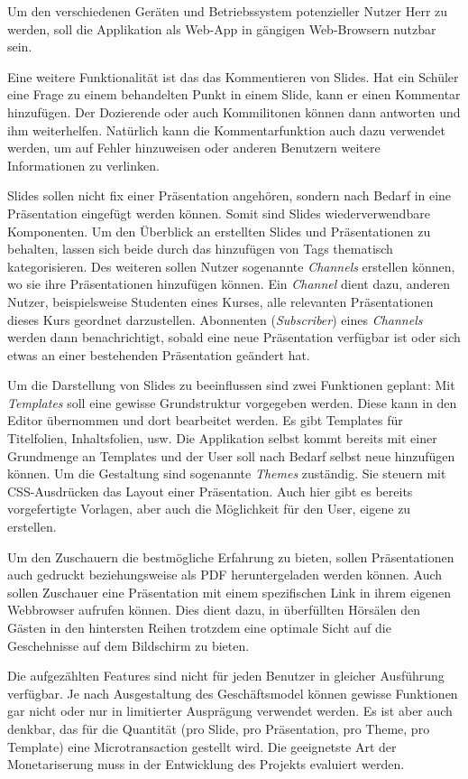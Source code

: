 Um den verschiedenen Geräten und Betriebssystem potenzieller Nutzer Herr zu werden, soll die Applikation als Web-App in gängigen Web-Browsern nutzbar sein.

Eine weitere Funktionalität ist das das Kommentieren von Slides. Hat ein Schüler eine Frage zu einem behandelten Punkt in einem Slide, kann er einen Kommentar hinzufügen. Der Dozierende oder auch Kommilitonen können dann antworten und ihm weiterhelfen. Natürlich kann die Kommentarfunktion auch dazu verwendet werden, um auf Fehler hinzuweisen oder anderen Benutzern weitere Informationen zu verlinken.

Slides sollen nicht fix einer Präsentation angehören, sondern nach Bedarf in eine Präsentation eingefügt werden können. Somit sind Slides wiederverwendbare Komponenten. Um den Überblick an erstellten Slides und Präsentationen zu behalten, lassen sich beide durch das hinzufügen von Tags thematisch kategorisieren. Des weiteren sollen Nutzer sogenannte \emph{Channels} erstellen können, wo sie ihre Präsentationen hinzufügen können. Ein \emph{Channel} dient dazu, anderen Nutzer, beispielsweise Studenten eines Kurses, alle relevanten Präsentationen dieses Kurs geordnet darzustellen. Abonnenten (\emph{Subscriber}) eines \emph{Channels} werden dann benachrichtigt, sobald eine neue Präsentation verfügbar ist oder sich etwas an einer bestehenden Präsentation geändert hat. 

Um die Darstellung von Slides zu beeinflussen sind zwei Funktionen geplant: Mit \emph{Templates} soll eine gewisse Grundstruktur vorgegeben werden. Diese kann in den Editor übernommen und dort bearbeitet werden. Es gibt Templates für Titelfolien, Inhaltsfolien, usw. Die Applikation selbst kommt bereits mit einer Grundmenge an Templates und der User soll nach Bedarf selbst neue hinzufügen können. Um die Gestaltung sind sogenannte \emph{Themes} zuständig. Sie steuern mit CSS-Ausdrücken das Layout einer Präsentation. Auch hier gibt es bereits vorgefertigte Vorlagen, aber auch die Möglichkeit für den User, eigene zu erstellen.

Um den Zuschauern die bestmögliche Erfahrung zu bieten, sollen Präsentationen auch gedruckt beziehungsweise als PDF heruntergeladen werden können. Auch sollen Zuschauer eine Präsentation mit einem spezifischen Link in ihrem eigenen Webbrowser aufrufen können. Dies dient dazu, in überfüllten Hörsälen den Gästen in den hintersten Reihen trotzdem eine optimale Sicht auf die Geschehnisse auf dem Bildschirm zu bieten.

Die aufgezählten Features sind nicht für jeden Benutzer in gleicher Ausführung verfügbar. Je nach Ausgestaltung  des Geschäftsmodel können gewisse Funktionen gar nicht oder nur in limitierter Ausprägung verwendet werden. Es ist aber auch denkbar, das für die Quantität (pro Slide, pro Präsentation, pro Theme, pro Template) eine Microtransaction gestellt wird. Die geeignetste Art der Monetariserung muss in der Entwicklung des Projekts evaluiert werden.



